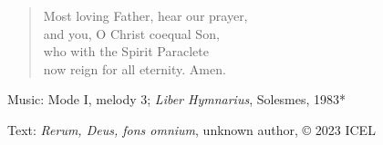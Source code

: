 \hymn



\setlength{\leftmargini}{2em}
\begin{verse}
Most loving Father, hear our prayer,\\
and you, O Christ coequal Son,\\
who with the Spirit Paraclete\\
now reign for all eternity. Amen.
\end{verse}
\setlength{\leftmargini}{\defleftmargini}

\begin{hymnsource}
Music: Mode I, melody 3; \emph{Liber Hymnarius}, Solesmes, 1983*

Text: \emph{Rerum, Deus, fons omnium}, unknown author, © 2023 ICEL
\end{hymnsource}
